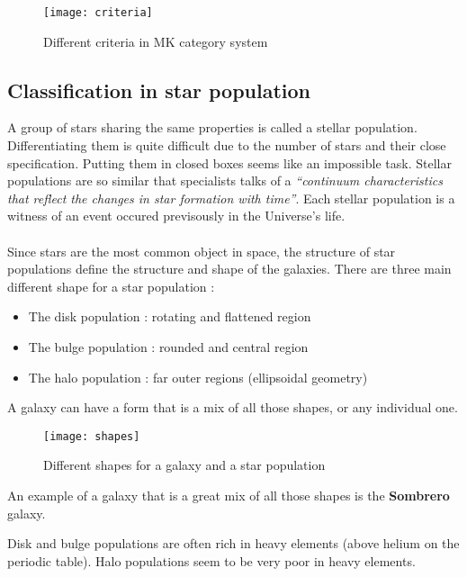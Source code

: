 \documentclass[a4paper, 11pt]{article} %
\begin{document}
\begin{figure}[h]
\centering
\texttt{[image: criteria]}
\caption{Different criteria in MK category system}
\end{figure}

\subsection{Classification in star population}

A group of stars sharing the same properties is called a stellar population. 
Differentiating them is quite difficult due to the number of stars and their close specification. Putting them in closed boxes seems like an impossible task. Stellar populations are so similar that specialists talks of a \textit{``continuum characteristics that reflect the changes in star formation with time''}. Each stellar population is a witness of an event occured previsously in the Universe's life.




\paragraph*{}
Since stars are the most common object in space, the structure of star populations define the structure and shape of the galaxies. There are three main different shape for a star population :

\begin{itemize}
 \item The disk population : rotating and flattened region
\item The bulge population : rounded and central region
\item The halo population : far outer regions (ellipsoidal geometry)

\end{itemize}

A galaxy can have a form that is a mix of all those shapes, or any individual one.
\newpage
\begin{figure}[h]
\centering
\texttt{[image: shapes]}
\caption{Different shapes for a galaxy and a star population}
\end{figure}

An example of a galaxy that is a great mix of all those shapes is the \textbf{Sombrero} galaxy. 

Disk and bulge populations are often rich in heavy elements (above helium on the periodic table). Halo populations seem to be very poor in heavy elements.
\end{document}
